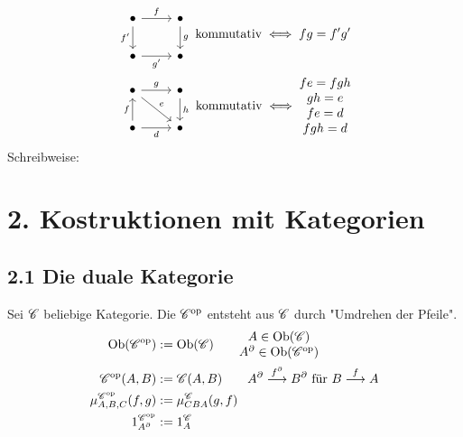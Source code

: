 \begin{beispiel}
	\begin{align*}
		\begin{tikzcd}[ampersand replacement=\&]
\bullet \arrow[r, "f"] \arrow[d, "f'"'] \& \bullet \arrow[d, "g"] \\
\bullet \arrow[r, "g'"']                \& \bullet               
\end{tikzcd}
\text{ kommutativ}\iff fg=f'g'\\
	\begin{tikzcd}[ampersand replacement=\&]
\bullet \arrow[r, "g"] \arrow[rd, "e"] \& \bullet \arrow[d, "h"] \\
\bullet \arrow[r, "d"'] \arrow[u, "f"] \& \bullet               
\end{tikzcd}
\text{ kommutativ}\iff \begin{matrix}
	fe=fgh\\
	gh=e\\
	fe=d\\
	fgh=d
\end{matrix}
	\end{align*}
	Schreibweise: %
\end{beispiel}

\chapter{2. Kostruktionen mit Kategorien}
\section{2.1 Die duale Kategorie}
Sei $\mathscr C$ beliebige Kategorie.
Die  $\mathscr C^{\text{op}}$ entsteht aus $\mathscr C$ durch "Umdrehen der Pfeile".
\begin{align*}
	\operatorname{Ob}(\mathscr C^{\text{op}})&:=\operatorname{Ob}(\mathscr C)\qquad\begin{matrix}
		A\in\operatorname{Ob}(\mathscr C)\\
		A^\partial\in\operatorname{Ob}(\mathscr C^{\text{op}})
	\end{matrix}\\
	\mathscr C^{\text{op}}(A,B)&:=\mathscr C(A,B)\qquad
	A^\partial\overset{f^\partial}{\longrightarrow}B^\partial\text{ für }B\overset{f}{\longrightarrow}A\\
	\mu_{A,B,C}^{\mathscr C^{\text{op}}}(f,g)&:=\mu_{CBA}^\mathscr C(g,f)\qquad\\
	1_{A^\partial}^{\mathscr C^{\text{op}}}&:=1_A^\mathscr C
\end{align*} %



